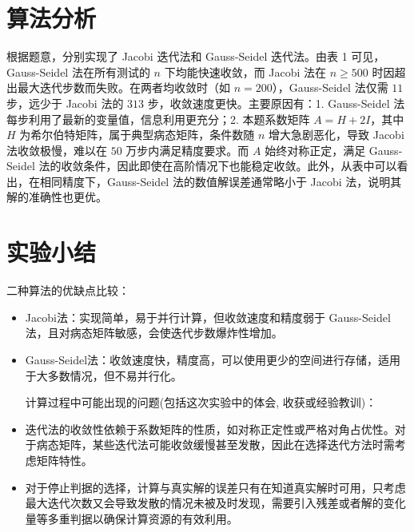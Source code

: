 \documentclass[UTF8]{ctexart}
\begin{document}
\section{算法分析}
根据题意，分别实现了 Jacobi 迭代法和 Gauss-Seidel 迭代法。由表 1 可见，Gauss-Seidel 法在所有测试的 $n$ 下均能快速收敛，而 Jacobi 法在 $n \geq 500$ 时因超出最大迭代步数而失败。在两者均收敛时（如 $n=200$），Gauss-Seidel 法仅需 $11$ 步，远少于 Jacobi 法的 $313$ 步，收敛速度更快。主要原因有：1. Gauss-Seidel 法每步利用了最新的变量值，信息利用更充分；2. 本题系数矩阵 $A = H + 2I$，其中 $H$ 为希尔伯特矩阵，属于典型病态矩阵，条件数随 $n$ 增大急剧恶化，导致 Jacobi 法收敛极慢，难以在 $50$ 万步内满足精度要求。而 $A$ 始终对称正定，满足 Gauss-Seidel 法的收敛条件，因此即使在高阶情况下也能稳定收敛。此外，从表中可以看出，在相同精度下，Gauss-Seidel 法的数值解误差通常略小于 Jacobi 法，说明其解的准确性也更优。

\section{实验小结}

{二种算法的优缺点比较}：
\begin{itemize}
\item  Jacobi法：实现简单，易于并行计算，但收敛速度和精度弱于 Gauss-Seidel 法，且对病态矩阵敏感，会使迭代步数爆炸性增加。
\item  Gauss-Seidel法：收敛速度快，精度高，可以使用更少的空间进行存储，适用于大多数情况，但不易并行化。

\hfill %

{计算过程中可能出现的问题(包括这次实验中的体会, 收获或经验教训)}：

\item 迭代法的收敛性依赖于系数矩阵的性质，如对称正定性或严格对角占优性。对于病态矩阵，某些迭代法可能收敛缓慢甚至发散，因此在选择迭代方法时需考虑矩阵特性。
\item 对于停止判据的选择，计算与真实解的误差只有在知道真实解时可用，只考虑最大迭代次数又会导致发散的情况未被及时发现，需要引入残差或者解的变化量等多重判据以确保计算资源的有效利用。
\end{itemize}
\end{document}
